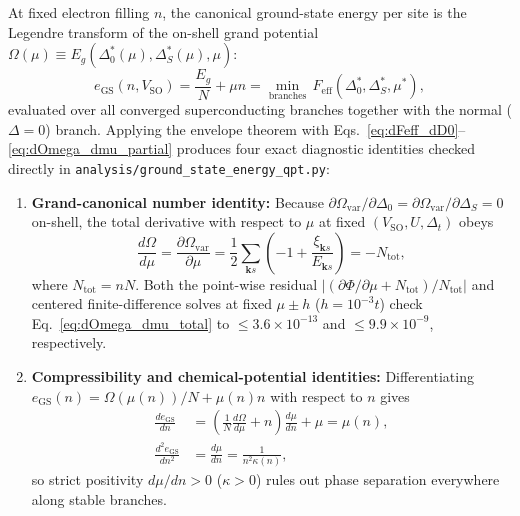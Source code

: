 \documentclass[aps,prb,twocolumn,superscriptaddress,longbibliography,floatfix]{revtex4-2}
\newcommand{\SO}{V_{\mathrm{SO}}}
\newcommand{\ks}{\mathbf{k}s}
\begin{document}
At fixed electron filling $n$, the canonical ground-state energy per site is the Legendre transform of the on-shell grand potential $\Omega(\mu) \equiv E_g(\Delta_0^*(\mu),\Delta_S^*(\mu),\mu)$:
\begin{equation}
e_{\mathrm{GS}}(n,\SO) = \frac{E_g}{N} + \mu n = \min_{\mathrm{branches}}\,F_{\mathrm{eff}}(\Delta_0^*,\Delta_S^*,\mu^*),
\label{eq:eGS_canonical}
\end{equation}
evaluated over all converged superconducting branches together with the normal ($\Delta=0$) branch. Applying the envelope theorem with Eqs.~\eqref{eq:dFeff_dD0}--\eqref{eq:dOmega_dmu_partial} produces four exact diagnostic identities checked directly in \texttt{analysis/\allowbreak ground\_state\_energy\_qpt.py}:
\begin{enumerate}
\item \textbf{Grand-canonical number identity:} Because $\partial\Omega_{\mathrm{var}}/\partial\Delta_0 = \partial\Omega_{\mathrm{var}}/\partial\Delta_S = 0$ on-shell, the total derivative with respect to $\mu$ at fixed $(\SO,U,\Delta_t)$ obeys
\begin{equation}
\frac{d\Omega}{d\mu} = \frac{\partial \Omega_{\mathrm{var}}}{\partial \mu} = \frac{1}{2}\sum_{\ks}\left(-1 + \frac{\xi_{\ks}}{E_{\ks}}\right) = -N_{\mathrm{tot}},
\label{eq:dOmega_dmu_total}
\end{equation}
where $N_{\mathrm{tot}} = nN$. Both the point-wise residual $|(\partial\Phi/\partial\mu + N_{\mathrm{tot}})/N_{\mathrm{tot}}|$ and centered finite-difference solves at fixed $\mu\pm h$ ($h=10^{-3}t$) check Eq.~\eqref{eq:dOmega_dmu_total} to $\le 3.6\times 10^{-13}$ and $\le 9.9\times 10^{-9}$, respectively.

\item \textbf{Compressibility and chemical-potential identities:} Differentiating $e_{\mathrm{GS}}(n) = \Omega(\mu(n))/N + \mu(n)n$ with respect to $n$ gives
\begin{align}
\frac{de_{\mathrm{GS}}}{dn} &= \left(\frac{1}{N}\frac{d\Omega}{d\mu} + n\right)\frac{d\mu}{dn} + \mu = \mu(n), \nonumber\\
\frac{d^2 e_{\mathrm{GS}}}{dn^2} &= \frac{d\mu}{dn} = \frac{1}{n^2\kappa(n)},
\label{eq:compressibility}
\end{align}
so strict positivity $d\mu/dn > 0$ ($\kappa>0$) rules out phase separation everywhere along stable branches.


\end{enumerate}
\end{document}
